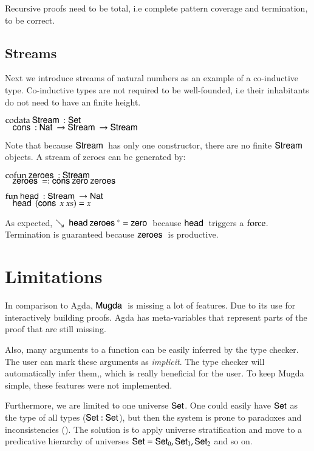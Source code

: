 Recursive proofs need to be total, i.e complete pattern coverage and termination, to be correct.

\subsection{Streams}
Next we introduce streams of natural numbers as an example of a co-inductive type.
Co-inductive types are not required to be well-founded, i.e their inhabitants do not need to have an finite height.
\begin{bsp}
$\mathrm{codata}\: \mathsf{Stream}\: : \mathsf{Set} $ \\
$\hspace*{3mm} \mathsf{cons}\: : \mathsf{Nat}\: \rightarrow \mathsf{Stream}\: \rightarrow \mathsf{Stream}\: $
\end{bsp}
Note that because $\mathsf{Stream}\:$ has only one constructor, there are no finite $\mathsf{Stream}\:$ objects.
A stream of zeroes can be generated by:
\begin{bsp}
$\mathrm{cofun}\: \mathsf{zeroes}\:: \mathsf{Stream}\: $ \\
$\hspace*{3mm} \mathsf{zeroes}\: = : \mathsf{cons}\: \mathsf{zero}\: \mathsf{zeroes}\:$
\end{bsp}

\begin{bsp}
$\mathrm{fun}\: \mathsf{head}\: : \mathsf{Stream}\: \rightarrow \mathsf{Nat}\:$\\
$\hspace*{3mm} \mathsf{head}\: \: (\mathsf{cons}\: \: x \: xs) = x$
\end{bsp}

As expected, $\searrow\; {\mathsf{head}\: \mathsf{zeroes}\:^{\diamond}} = \mathsf{zero}\: $ because $\mathsf{head}\:$ triggers a $\mathrm{force}$. Termination is guaranteed because $\mathsf{zeroes}\:$ is productive.

\section{Limitations}
In comparison to Agda, $\textsf{Mugda }$ is missing a lot of features.
Due to its use for interactively building proofs. Agda has meta-variables that represent parts of the proof that are still missing. 

Also, many arguments to a function can be easily inferred by the type checker.
The user can mark these arguments as \emph{implicit}. The type checker will automatically infer them,, which is really beneficial for the user.
To keep Mugda simple, these features were not implemented.

Furthermore, we are limited to one universe $\mathsf{Set}$.
One could easily have $\mathsf{Set}$ as the type of all types ($\mathsf{Set} : \mathsf{Set}$), but then the system is prone to paradoxes and inconsistencies (\cite{coquand86analysis,coquand92pattern}).
The solution is to apply universe stratification and move to a predicative hierarchy of universes $ \mathsf{Set} = \mathsf{Set}_0 , \mathsf{Set}_1 , \mathsf{Set}_2 $ and so on. 
